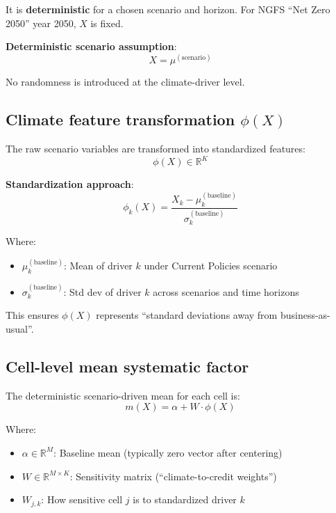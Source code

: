 \documentclass[11pt,a4paper]{article}
\begin{document}
It is \textbf{deterministic} for a chosen scenario and horizon. For NGFS ``Net Zero 2050'' year 2050, $X$ is fixed.

\textbf{Deterministic scenario assumption}:
\begin{equation}
X = \mu^{(\text{scenario})}
\end{equation}

No randomness is introduced at the climate-driver level.

\subsection{Climate feature transformation $\phi(X)$}

The raw scenario variables are transformed into standardized features:
\begin{equation}
\phi(X) \in \mathbb{R}^K
\end{equation}

\textbf{Standardization approach}:
\begin{equation}
\phi_k(X) = \frac{X_k - \mu_k^{(\text{baseline})}}{\sigma_k^{(\text{baseline})}}
\end{equation}

Where:
\begin{itemize}
    \item $\mu_k^{(\text{baseline})}$: Mean of driver $k$ under Current Policies scenario
    \item $\sigma_k^{(\text{baseline})}$: Std dev of driver $k$ across scenarios and time horizons
\end{itemize}

This ensures $\phi(X)$ represents ``standard deviations away from business-as-usual''.

\subsection{Cell-level mean systematic factor}

The deterministic scenario-driven mean for each cell is:
\begin{equation}
m(X) = \alpha + W \cdot \phi(X)
\end{equation}

Where:
\begin{itemize}
    \item $\alpha \in \mathbb{R}^M$: Baseline mean (typically zero vector after centering)
    \item $W \in \mathbb{R}^{M \times K}$: Sensitivity matrix (``climate-to-credit weights'')
    \item $W_{j,k}$: How sensitive cell $j$ is to standardized driver $k$
\end{itemize}
\end{document}
